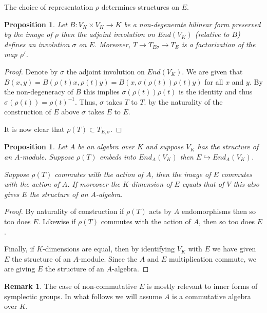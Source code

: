 \documentclass{article}
\theoremstyle{plain}
\newtheorem{proposition}[theorem]{Proposition}
\theoremstyle{definition}
\newtheorem{remark}[theorem]{Remark}
\begin{document}
The choice of representation $\rho$ determines structures on $E$.

\begin{proposition}
Let $B : V_K \times V_K \rightarrow K$ be a non-degenerate bilinear form preserved by the image of $\rho$ then the adjoint involution on $End(V_K)$ (relative to $B$) defines an involution $\sigma$ on $E$.
Moreover, $T \rightarrow T_{E\sigma} \rightarrow T_E$ is a factorization of the map $\rho'$.
\end{proposition}
\begin{proof}
Denote by $\sigma$ the adjoint involution on $End(V_K)$.
We are given that $B(x,y) = B(\rho(t)x,\rho(t)y) = B(x,\sigma(\rho(t))\rho(t)y)$ for all $x$ and $y$. By the non-degeneracy of $B$ this implies $\sigma(\rho(t))\rho(t)$ is the identity and thus $\sigma(\rho(t)) = \rho(t)^{-1}$. Thus, $\sigma$ takes $T$ to $T$. by the naturality of the construction of $E$ above $\sigma$ takes $E$ to $E$.

It is now clear that $\rho(T) \subset T_{E,\sigma}$.
\end{proof}



\begin{proposition}
Let $A$ be an algebra over $K$ and suppose $V_K$ has the structure of an $A$-module.
Suppose $\rho(T)$ embeds into $End_A(V_K)$ then $E\hookrightarrow End_A(V_K)$.

Suppose $\rho(T)$ commutes with the action of $A$, then the image of $E$ commutes with the action of $A$.
If moreover the $K$-dimension of $E$ equals that of $V$ this also gives $E$ the structure of an $A$-algebra.
\end{proposition}
\begin{proof}
By naturality of construction if $\rho(T)$ acts by $A$ endomorphisms then so too does $E$.
Likewise if $\rho(T)$ commutes with the action of $A$, then so too does $E$.

Finally, if $K$-dimensions are equal, then by identifying $V_K$ with $E$ we have given $E$ the structure of an $A$-module. Since the $A$ and $E$ multiplication commute, we are giving $E$ the structure of an $A$-algebra.
\end{proof}
\begin{remark}
The case of non-commutative $E$ is mostly relevant to inner forms of symplectic groups.
In what follows we will assume $A$ is a commutative algebra over $K$.
\end{remark}
\end{document}
